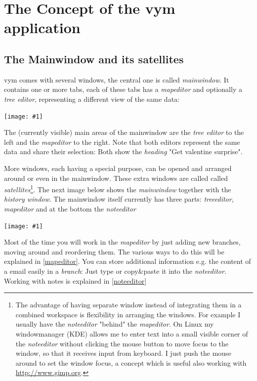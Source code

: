 \documentclass[12pt,a4paper]{article}
\newcommand{\maximage}[1]{  
    \begin{center}
        \texttt{[image: \#1]} 
    \end{center}
}
\newcommand{\vym}{{\sc vym }}
\begin{document}
\section{The Concept of the \vym application}
\subsection{The Mainwindow and its satellites} \label{satellite}
\vym comes with several windows, the central one is called {\em
mainwindow}. It contains one or more
tabs, each of these tabs has a {\em mapeditor} and optionally a {\em
tree editor}, representing a different view of the same data:
\maximage{images/mainwindow.png}
The (currently visible) main areas of the mainwindow are the {\em tree
editor} to the left and the {\em mapeditor} to the right. Note that both
editors represent the same data and share their selection: Both show the
{\em heading} "Get valentine surprise".

More windows, each having a special purpose, can be opened and arranged
around or even in the mainwindow. These extra windows are called
called {\em satellites}\footnote{
    The advantage of having separate window instead of integrating them
    in a combined workspace is flexibility in arranging the windows. For
    example I usually have the {\em noteeditor} "behind" the {\em
    mapeditor}. On Linux my windowmanager (KDE) allows me to enter text
    into a small visible corner of the {\em noteeditor} without clicking
    the mouse button to move focus to the window, so that it receives
    input from keyboard. I just push the mouse around to set the
    window focus, a concept which is useful also working with 
    \href{http://www.gimp.org}{http://www.gimp.org}.
}. 
The next image below shows the {\em mainwindow}
together with the {\em history window}. The mainwindow itself currently
has three parts: {\em treeeditor}, {\em mapeditor} and at the bottom
the {\em noteeditor}
\maximage{images/windows.png}
Most of the time you will work in the {\em mapeditor} by just adding new
branches, moving around and reordering them. The various ways to do this
will be explained in \ref{mapeditor}. You can store additional
information e.g. the content of a email easily in a {\em branch}: Just
type or copy\&paste it into the {\em noteeditor}. Working with notes is
explained in \ref{noteeditor}
\end{document}
